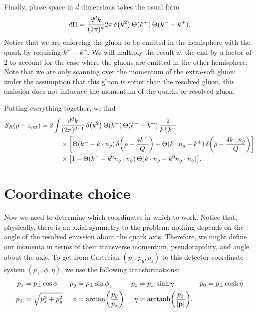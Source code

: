 \documentclass[11pt,twoside,reqno]{amsart}
\theoremstyle{plain}
\theoremstyle{remark}
\theoremstyle{definition}
\theoremstyle{remark}
\theoremstyle{definition}
\theoremstyle{definition}
\newcommand{\zcut}{z_\mathrm{cut}}
\newcommand{\arctanh}{\mathrm{arctanh}}
\begin{document}
	Finally, phase space in $d$ dimensions takes the usual form
	\begin{equation}
		d\Pi = \frac{d^d k}{(2\pi)^d} 2\pi\,\delta\qty(k^2)\,\Theta(k^+)\,\Theta(k^- - k^+).
	\end{equation}
	Notice that we are enforcing the gluon to be emitted in the hemisphere with the quark by requiring $k^- - k^+$. We will multiply the result at the end by a factor of $2$ to account for the case where the gluons are emitted in the other hemisphere. Note that we are only scanning over the momentum of the extra-soft gluon: under the assumption that this gluon is softer than the resolved gluon, this emission does not influence the momentum of the quarks or resolved gluon.

	Putting everything together, we find
	\begin{equation}\label{eq:soft integral}
	\begin{aligned}
		S_R(\rho - \zcut) = 2 \int& \frac{d^d k}{(2\pi)^{d-1}} \, \delta\qty(k^2)\,\Theta(k^+)\,\Theta(k^- - k^+) \,\frac{2}{k^+ k^-} \\
		&\times \qty[\Theta(k^+ - k\cdot n_g)\,\delta\qty(\rho - \frac{4k^+}{Q}) + \Theta(k\cdot n_g - k^+)\,\delta\qty(\rho - \frac{4k\cdot n_g}{Q})] \\
		&\times \qty[1 - \Theta(k^+ - k^0 n_g \cdot n_q)\,\Theta(k \cdot n_g - k^0 n_g \cdot n_q)].
	\end{aligned}
	\end{equation}

\section{Coordinate choice}
	Now we need to determine which coordinates in which to work. Notice that, physically, there is an axial symmetry to the problem: nothing depends on the angle of the resolved emission about the quark axis. Therefore, we might define our momenta in terms of their transverse momentum, pseudorapidity, and angle about the axis. To get from Cartesian $(p_x, p_y, p_z)$ to this detector coordinate system $(p_\perp, \phi, \eta)$, we use the following transformations:
	\begin{equation}
	\begin{aligned}
		p_x &= p_\perp \cos\phi & p_y &= p_\perp \sin\phi & p_z &= p_\perp \sinh\eta & p_0 &= p_\perp \cosh\eta \\
		p_\perp &= \sqrt{p_x^2 + p_y^2} & \phi &= \arctan(\frac{p_y}{p_x}) & \eta &= \arctanh\qty(\frac{p_z}{\abs{\vb{p}}}).
	\end{aligned}
	\end{equation}
\end{document}
